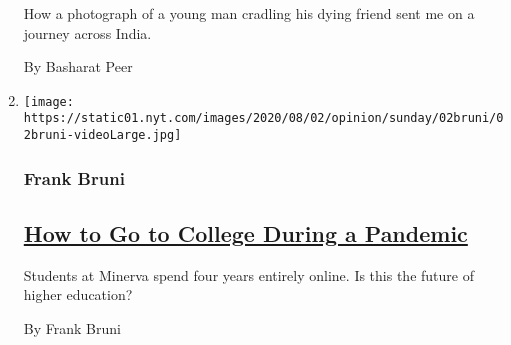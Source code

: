 \begin{enumerate}
  How a photograph of a young man cradling his dying friend sent me on a
  journey across India.

  By Basharat Peer
\item
  \texttt{[image: https://static01.nyt.com/images/2020/08/02/opinion/sunday/02bruni/02bruni-videoLarge.jpg]}

  \hypertarget{frank-bruni}{%
  \subsubsection{Frank Bruni}\label{frank-bruni}}

  \hypertarget{how-to-go-to-college-during-a-pandemic}{%
  \subsection{\texorpdfstring{\href{/2020/08/01/opinion/sunday/minerva-college-coronavirus.html}{How
  to Go to College During a
  Pandemic}}{How to Go to College During a Pandemic}}\label{how-to-go-to-college-during-a-pandemic}}

  Students at Minerva spend four years entirely online. Is this the
  future of higher education?

  By Frank Bruni
\end{enumerate}

